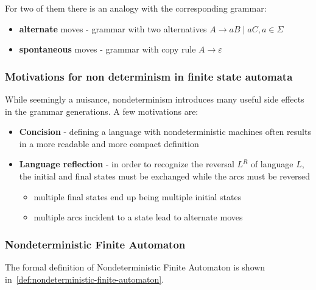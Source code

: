 \documentclass[english]{article}
\begin{document}
For two of them there is an analogy with the corresponding grammar:

\begin{itemize}
  \item \textbf{alternate} moves - grammar with two alternatives \(A \rightarrow aB \mid aC, a \in \Sigma\)
  \item \textbf{spontaneous} moves - grammar with copy rule \(A \rightarrow \varepsilon\)
\end{itemize}

\subsubsection{Motivations for non determinism in finite state automata}

While seemingly a nuisance, nondeterminism introduces many useful side effects in the grammar generations.
A few motivations are:

\begin{itemize}
  \item \textbf{Concision} - defining a language with nondeterministic machines often results in a more readable and more compact definition
  \item \textbf{Language reflection} - in order to recognize the reversal \(L^R\) of language \(L\), the initial and final states must be exchanged while the arcs must be reversed
        \begin{itemize}[label=\(\rightarrow\)]
          \item multiple final states end up being multiple initial states
          \item multiple arcs incident to a state lead to alternate moves
        \end{itemize}
\end{itemize}

\subsubsection{Nondeterministic Finite Automaton}
\label{sec:nondeterministic-finite-automaton}

The formal definition of Nondeterministic Finite Automaton is shown in~\ref{def:nondeterministic-finite-automaton}.
\end{document}
